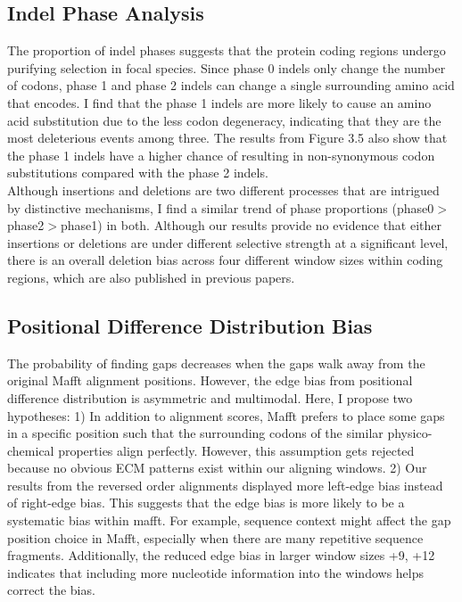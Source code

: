 \subsection{Indel Phase Analysis}
The proportion of indel phases suggests that the protein coding regions undergo purifying selection in focal species. Since phase 0 indels only change the number of codons, phase 1 and phase 2 indels can change a single surrounding amino acid that encodes. I find that the phase 1 indels are more likely to cause an amino acid substitution due to the less codon degeneracy, indicating that they are the most deleterious events among three. The results from Figure 3.5 also show that the phase 1 indels have a higher chance of resulting in non-synonymous codon substitutions compared with the phase 2 indels. \\ 
\indent Although insertions and deletions are two different processes that are intrigued by distinctive mechanisms, I find a similar trend of phase proportions (phase0$>$phase2$>$phase1) in both.  Although our results provide no evidence that either insertions or deletions are under different selective strength at a significant level, there is an overall deletion bias across four different window sizes within coding regions, which are also published in previous papers. 

\subsection{Positional Difference Distribution Bias}
The probability of finding gaps decreases when the gaps walk away from the original Mafft alignment positions. However, the edge bias from positional difference distribution is asymmetric and multimodal. Here, I propose two hypotheses: 1) In addition to alignment scores, Mafft prefers to place some gaps in a specific position such that the surrounding codons of the similar physico-chemical properties align perfectly. However, this assumption gets rejected because no obvious ECM patterns exist within our aligning windows. 2) Our results from the reversed order alignments displayed more left-edge bias instead of right-edge bias. This suggests that the edge bias is more likely to be a systematic bias within mafft. For example, sequence context might affect the gap position choice in Mafft, especially when there are many repetitive sequence fragments. Additionally, the reduced edge bias in larger window sizes +9, +12 indicates that including more nucleotide information into the windows helps correct the bias. 



 



